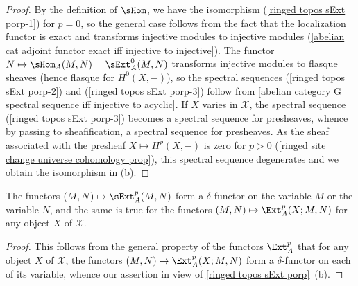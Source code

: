 \begin{proof}
By the definition of $\sHom$, we have the isomorphism (\ref{ringed topos sExt porp-1}) for $p=0$, so the general case follows from the fact that the localization functor is exact and transforms injective modules to injective modules (\ref{abelian cat adjoint functor exact iff injective to injective}). The functor $N\mapsto\sHom_A(M,N)=\sExt_A^0(M,N)$ transforms injective modules to flasque sheaves (hence flasque for $H^0(X,-)$), so the spectral sequences (\ref{ringed topos sExt porp-2}) and (\ref{ringed topos sExt porp-3}) follow from \cref{abelian category G spectral sequence iff injective to acyclic}. If $X$ varies in $\mathcal{X}$, the spectral sequence (\ref{ringed topos sExt porp-3}) becomes a spectral sequence for presheaves, whence by passing to sheafification, a spectral sequence for presheaves. As the sheaf associated with the presheaf $X\mapsto H^p(X,-)$ is zero for $p>0$ (\cref{ringed site change universe cohomology prop}), this spectral sequence degenerates and we obtain the isomorphism in (b).
\end{proof}

\begin{proposition}\label{ringed topos sExt is delta-functor}
The functors $(M,N)\mapsto\sExt_A^p(M,N)$ form a $\delta$-functor on the variable $M$ or the variable $N$, and the same is true for the functors $(M,N)\mapsto\Ext_A^p(X;M,N)$ for any object $X$ of $\mathcal{X}$.
\end{proposition}
\begin{proof}
This follows from the general property of the functors $\Ext_A^p$ that for any object $X$ of $\mathcal{X}$, the functors $(M,N)\mapsto\Ext_A^p(X;M,N)$ form a $\delta$-functor on each of its variable, whence our assertion in view of \cref{ringed topos sExt porp}~(b).
\end{proof}

